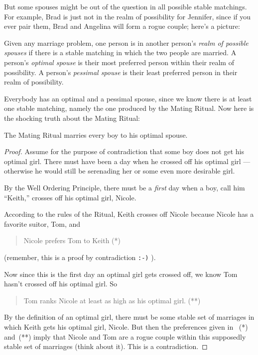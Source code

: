 But some spouses might be out of the question in all possible stable
matchings.  For example, Brad is just not in the realm of possibility for
Jennifer, since if you ever pair them, Brad and Angelina will form a rogue
couple; here's a picture:


\begin{definition}
Given any marriage problem, one person is in another person's \emph{realm
of possible spouses} if there is a stable matching in which the two people
are married.  A person's {\em optimal spouse} is their most preferred
person within their realm of possibility.  A person's {\em pessimal
spouse} is their least preferred person in their realm of possibility.
\end{definition}

Everybody has an optimal and a pessimal spouse, since we know there is at
least one stable matching, namely the one produced by the Mating Ritual.
Now here is the shocking truth about the Mating Ritual:

\begin{theorem}\label{boyopt}
The Mating Ritual marries every boy to his optimal spouse.
\end{theorem}

\begin{proof}
Assume for the purpose of contradiction that some boy does not get his
optimal girl.  There must have been a day when he crossed off his optimal
girl ---otherwise he would still be serenading her or some even more
desirable girl.

By the Well Ordering Principle, there must be a \emph{first} day when a
boy, call him ``Keith,'' crosses off his optimal girl, Nicole.

According to the rules of the Ritual, Keith crosses off Nicole because
Nicole has a favorite suitor, Tom, and
\begin{quote}
Nicole prefers Tom to Keith (*)
\end{quote}
(remember, this is a proof by contradiction \texttt{:-)} ).

Now since this is the first day an optimal girl gets crossed off, we know
Tom hasn't crossed off his optimal girl.  So
\begin{quote}
Tom ranks Nicole at least as high as his optimal girl. (**)
\end{quote}
By the definition of an optimal girl, there must be some stable set of
marriages in which Keith gets his optimal girl, Nicole.  But then the
preferences given in ~(*) and~(**) imply that Nicole and Tom are a
rogue couple within this supposedly stable set of marriages (think
about it).  This is a contradiction.
\end{proof}

